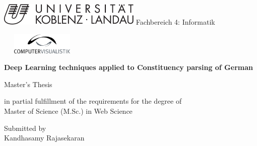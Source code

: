 \documentclass[a4paper, 11pt]{article}
\newcommand{\myName}{Kandhasamy Rajasekaran}
\newcommand{\Title}{Deep Learning techniques applied to Constituency parsing of German}
\begin{document}
\thispagestyle{empty}


\begin{titlepage}
\enlargethispage{3em}

\begin{minipage}{0.45\textwidth}
  \begin{flushleft} \small
    \includegraphics[width=68mm]{Uni-Logo}
    \hspace*{16mm}Fachbereich 4: Informatik
  \end{flushleft}
\end{minipage}
\hfill
\begin{minipage}{0.45\textwidth}
  \begin{flushright} \small
   \includegraphics[width=40mm, height=10mm]{cvlogo.png}
     {\ }
  \end{flushright}
\end{minipage}

\hspace*{10mm}
\begin{minipage}[b]{0.8\textwidth}
  \begin{flushleft}
  \vspace{2cm}  
 
\begin{center}

\Huge{\bf \Title} \\
\vspace{4em}

\LARGE{
	Master's Thesis
} %

\hspace*{10mm}
\normalsize{
	in partial fulfillment of the requirements for the degree of \\
	 Master of Science (M.Sc.) in Web Science
}
\vspace{2em}

\small{Submitted by} \\
\Large{
  \myName
}
\vspace{6em}


\end{center}
\end{flushleft}
\end{minipage}
\end{titlepage}
\end{document}
